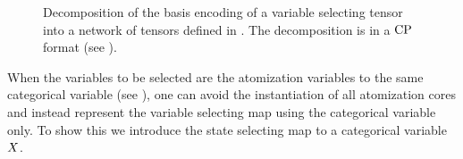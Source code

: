 
\begin{figure}[t]
    \begin{center}
        
    \end{center}
    \caption{Decomposition of the basis encoding of a variable selecting tensor into a network of tensors defined in .
    The decomposition is in a $\mathrm{CP}$ format (see ). %
    }
    \label{fig:SelectorDecomposition}
\end{figure}





When the variables to be selected are the atomization variables to the same categorical variable (see ), one can avoid the instantiation of all atomization cores and instead represent the variable selecting map using the categorical variable only.
To show this we introduce the state selecting map to a categorical variable $X$.

